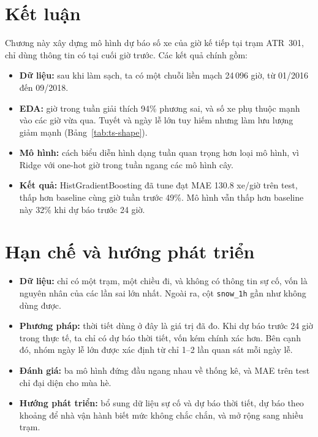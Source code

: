 \section{Kết luận}
\label{sec:ts-conclusion}
Chương này xây dựng mô hình dự báo số xe của giờ kế tiếp tại trạm ATR~301, chỉ dùng thông tin có tại cuối giờ trước. Các kết quả chính gồm:
\begin{itemize}[leftmargin=1.5cm]
    \item \textbf{Dữ liệu:} sau khi làm sạch, ta có một chuỗi liền mạch 24\,096 giờ, từ 01/2016 đến 09/2018.
    \item \textbf{EDA:} giờ trong tuần giải thích 94\% phương sai, và số xe phụ thuộc mạnh vào các giờ vừa qua. Tuyết và ngày lễ lớn tuy hiếm
          nhưng làm lưu lượng giảm mạnh (Bảng~\ref{tab:ts-shape}).
    \item \textbf{Mô hình:} cách biểu diễn hình dạng tuần quan trọng hơn loại mô hình, vì Ridge với one-hot giờ trong tuần ngang các mô hình
          cây.
    \item \textbf{Kết quả:} HistGradientBoosting đã tune đạt MAE 130.8 xe/giờ trên test, thấp hơn baseline cùng giờ tuần trước 49\%. Mô hình
          vẫn thấp hơn baseline này 32\% khi dự báo trước 24 giờ.
\end{itemize}

\section{Hạn chế và hướng phát triển}
\label{sec:ts-limits}
\begin{itemize}[leftmargin=1.5cm]
    \item \textbf{Dữ liệu:} chỉ có một trạm, một chiều đi, và không có thông tin sự cố, vốn là nguyên nhân của các lần sai lớn nhất. Ngoài ra,
          cột \texttt{snow\_1h} gần như không dùng được.
    \item \textbf{Phương pháp:} thời tiết dùng ở đây là giá trị đã đo. Khi dự báo trước 24 giờ trong thực tế, ta chỉ có dự báo thời tiết, vốn
          kém chính xác hơn. Bên cạnh đó, nhóm ngày lễ lớn được xác định từ chỉ 1--2 lần quan sát mỗi ngày lễ.
    \item \textbf{Đánh giá:} ba mô hình đứng đầu ngang nhau về thống kê, và MAE trên test chỉ đại diện cho mùa hè.
    \item \textbf{Hướng phát triển:} bổ sung dữ liệu sự cố và dự báo thời tiết, dự báo theo khoảng để nhà vận hành biết mức không chắc chắn,
          và mở rộng sang nhiều trạm.
\end{itemize}

